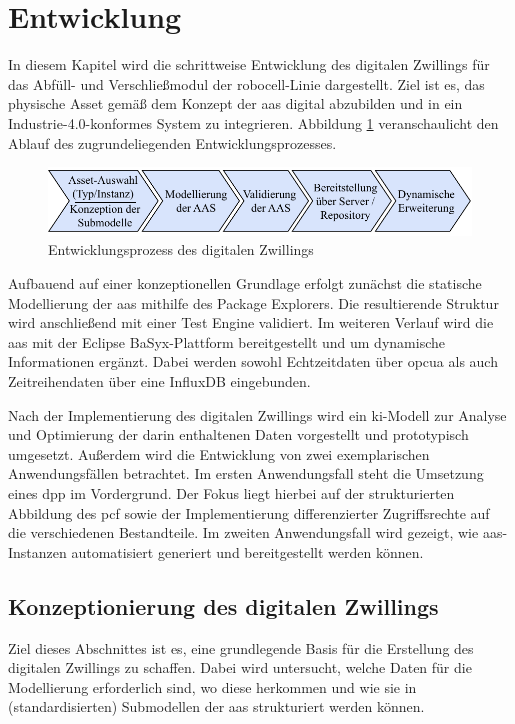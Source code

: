 \newpage
\section{Entwicklung}
\label{sec:Entwicklung}
In diesem Kapitel wird die schrittweise Entwicklung des digitalen Zwillings für das Abfüll- und Verschließmodul der robocell-Linie dargestellt.
Ziel ist es, das physische Asset gemäß dem Konzept der \acs{aas} digital abzubilden und in ein Industrie-4.0-konformes System zu integrieren.
Abbildung \ref{fig:Entwicklungsschritte} veranschaulicht den Ablauf des zugrundeliegenden Entwicklungsprozesses.

\begin{figure}[htbp]
    \centering
    \includegraphics[width=1\textwidth]{Bilder/vorgehenEntwicklungsteil.pdf}
    \caption[Entwicklungsprozess des digitalen Zwillings]{Entwicklungsprozess des digitalen Zwillings}
    \label{fig:Entwicklungsschritte}
\end{figure}
\vspace{-0.5em}

Aufbauend auf einer konzeptionellen Grundlage erfolgt zunächst die statische Modellierung der \acs{aas} mithilfe des Package Explorers. 
Die resultierende Struktur wird anschließend mit einer Test Engine validiert.
Im weiteren Verlauf wird die \acs{aas} mit der Eclipse BaSyx-Plattform bereitgestellt und um dynamische Informationen ergänzt. 
Dabei werden sowohl Echtzeitdaten über \acs{opcua} als auch Zeitreihendaten über eine InfluxDB eingebunden.

Nach der Implementierung des digitalen Zwillings wird ein \acs{ki}-Modell zur Analyse und Optimierung der darin enthaltenen Daten vorgestellt und prototypisch umgesetzt.
Außerdem wird die Entwicklung von zwei exemplarischen Anwendungsfällen betrachtet.
Im ersten Anwendungsfall steht die Umsetzung eines \acs{dpp} im Vordergrund. 
Der Fokus liegt hierbei auf der strukturierten Abbildung des \acs{pcf} sowie der Implementierung differenzierter Zugriffsrechte auf die verschiedenen Bestandteile.
Im zweiten Anwendungsfall wird gezeigt, wie \acs{aas}-Instanzen automatisiert generiert und bereitgestellt werden können.

\subsection{Konzeptionierung des digitalen Zwillings}
Ziel dieses Abschnittes ist es, eine grundlegende Basis für die Erstellung des digitalen Zwillings zu schaffen.
Dabei wird untersucht, welche Daten für die Modellierung erforderlich sind, wo diese herkommen und wie sie in (standardisierten) Submodellen der \acs{aas} strukturiert werden können.
